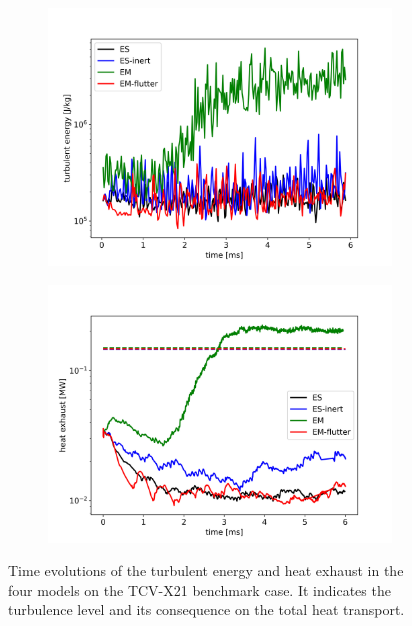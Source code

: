 \begin{figure}[H]\centering
	\begin{subfigure}[t]{0.45\textwidth}
		\centering
		\includegraphics[width=1\textwidth]{schemes/Eturb_sep.png}
		\label{fig:KE_ExB}
	\end{subfigure}
	\begin{subfigure}[t]{0.45\textwidth}
		\centering
		\includegraphics[width=1\textwidth]{schemes/heatExhaust_noNeutr.jpg}
		\label{fig:HeatExhaust}
	\end{subfigure}
	\caption[Evolution of the turbulent energy and heat exhaust over time iterations on the turbulent the TCV-X21 benchmark case]{Time evolutions of the turbulent energy and heat exhaust in the four models on the TCV-X21 benchmark case. It indicates the turbulence level and its consequence on the total heat transport.}
	\label{fig:plasmaEvolution}
\end{figure}

